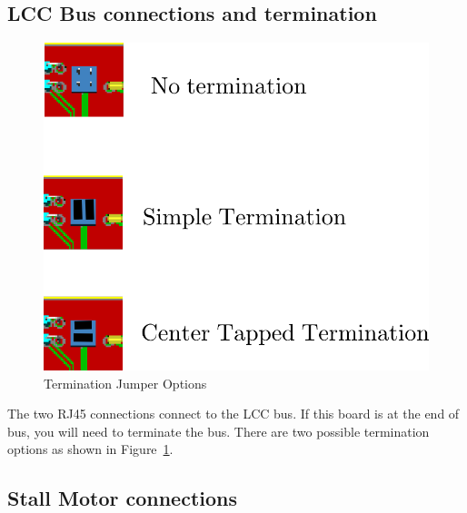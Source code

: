\subsection{LCC Bus connections and termination}

\begin{figure}[hbpt]\begin{centering}%
\includegraphics{ESP32-PWMHalfSidingTermination.png}
\caption{Termination Jumper Options}
\label{fig:ESP32-PWMHalfSidingTermination}
\end{centering}\end{figure}
The two RJ45 connections connect to the LCC bus.  If this board is at the end 
of bus, you will need to terminate the bus.  There are two possible 
termination options as shown in 
Figure~\ref{fig:ESP32-PWMHalfSidingTermination}.

\subsection{Stall Motor connections}

